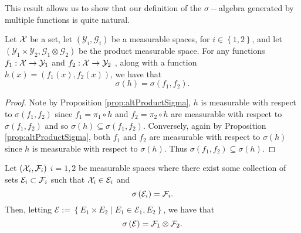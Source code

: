 This result allows us to show that our definition of the $\sigma-$algebra
generated by multiple functions is quite natural.
\begin{cor}
\label{cor:sigmaTupleisSigmaUnpack}Let $\mathcal{X}$ be a set, let $\left(\mathcal{Y}_{i},\mathcal{G}_{i}\right)$
be a measurable spaces, for $i\in\left\{ 1,2\right\} $, and let $\left(\mathcal{Y}_{1}\times\mathcal{Y}_{2},\mathcal{G}_{1}\otimes\mathcal{G}_{2}\right)$
be the product measurable space. For any functions $f_{1}:\mathcal{X}\to\mathcal{Y}_{1}$
and $f_{2}:\mathcal{X}\to\mathcal{Y}_{2}$ , along with a function $h\left(x\right)=\left(f_{1}\left(x\right),f_{2}\left(x\right)\right)$,
we have that 
\[
\sigma\left(h\right)=\sigma\left(f_{1},f_{2}\right).
\]
\end{cor}

\begin{proof}
Note by Proposition \ref{prop:altProductSigma}, $h$ is measurable
with respect to $\sigma\left(f_{1},f_{2}\right)$ since $f_{1}=\pi_{1}\circ h$
and $f_{2}=\pi_{2}\circ h$ are measurable with respect to $\sigma\left(f_{1},f_{2}\right)$
and so $\sigma\left(h\right)\subseteq\sigma\left(f_{1},f_{2}\right).$
Conversely, again by Proposition \ref{prop:altProductSigma}, both
$f_{1}$ and $f_{2}$ are measurable with respect to $\sigma\left(h\right)$
since $h$ is measurable with respect to $\sigma\left(h\right)$.
Thus $\sigma\left(f_{1},f_{2}\right)\subseteq\sigma\left(h\right).$
\end{proof}
\begin{prop}
\label{prop:productGenerator}Let $\left(\mathcal{X}_{i},\mathcal{F}_{i}\right)$ $i=1,2$
be measurable spaces where there exist some collection of sets $\mathcal{E}_{i}\subset\mathcal{F}_{i}$
such that $\mathcal{X}_{i}\in\mathcal{E}_{i}$ and 
\[
\sigma\left(\mathcal{E}_{i}\right)=\mathcal{F}_{i}.
\]
Then, letting $\mathcal{E}:=\left\{ E_{1}\times E_{2}\mid E_{1}\in\mathcal{E}_{1},E_{2}\right\} $,
we have that 
\[
\sigma\left(\mathcal{E}\right)=\mathcal{F}_{1}\otimes\mathcal{F}_{2}.
\]
\end{prop}

